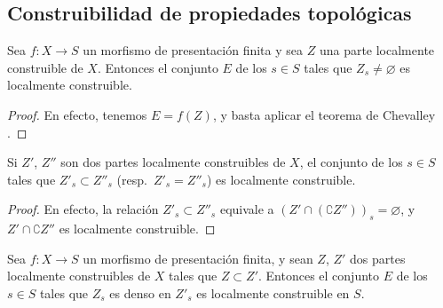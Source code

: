 \subsection{Construibilidad de propiedades topológicas}
\label{subsection:IV.9.5}

\begin{proposition}[9.5.1]
\label{IV.9.5.1}
Sea $f:X\to S$ un morfismo de presentación finita y sea $Z$ una parte localmente construible de $X$.
Entonces el conjunto $E$ de los $s\in S$ tales que $Z_s\neq\varnothing$ es localmente construible.
\end{proposition}

\begin{proof}
En efecto, tenemos $E=f(Z)$, y basta aplicar el teorema de Chevalley .
\end{proof}

\begin{corollary}[9.5.2]
\label{IV.9.5.2}
Si $Z'$, $Z''$ son dos partes localmente construibles de $X$, el conjunto de los $s\in S$ tales que $Z'_s\subset Z''_s$ \textnormal{(resp.}\ $Z'_s=Z''_s$\textnormal{)} es localmente construible.
\end{corollary}

\begin{proof}
En efecto, la relación $Z'_s\subset Z''_s$ equivale a $(Z'\cap(\complement Z''))_s=\varnothing$, y $Z'\cap\complement Z''$ es localmente construible.
\end{proof}

\begin{proposition}[9.5.3]
\label{IV.9.5.3}
Sea $f:X\to S$ un morfismo de presentación finita, y sean $Z$, $Z'$ dos partes localmente construibles de $X$ tales que $Z\subset Z'$.
Entonces el conjunto $E$ de los $s\in S$ tales que $Z_s$ es denso en $Z'_s$ es localmente construible en $S$.
\end{proposition}

